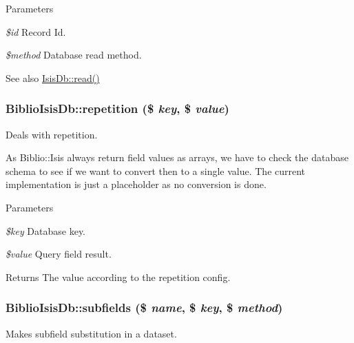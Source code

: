 \begin{DoxyParams}{Parameters}
\item[{\em \$id}]Record Id.\item[{\em \$method}]Database read method.\end{DoxyParams}
\begin{DoxySeeAlso}{See also}
\hyperlink{interfaceIsisDb_a68335ec0db01ef03f0725621b38b5686}{IsisDb::read()} 
\end{DoxySeeAlso}
\hypertarget{classBiblioIsisDb_a04089d61ce04b18aa6a78c94ca02edb9}{
\subsubsection[{repetition}]{\setlength{\rightskip}{0pt plus 5cm}BiblioIsisDb::repetition (\$ {\em key}, \/  \$ {\em value})}}
\label{classBiblioIsisDb_a04089d61ce04b18aa6a78c94ca02edb9}
Deals with repetition.

As Biblio::Isis always return field values as arrays, we have to check the database schema to see if we want to convert then to a single value. The current implementation is just a placeholder as no conversion is done.


\begin{DoxyParams}{Parameters}
\item[{\em \$key}]Database key.\item[{\em \$value}]Query field result.\end{DoxyParams}
\begin{DoxyReturn}{Returns}
The value according to the repetition config. 
\end{DoxyReturn}
\hypertarget{classBiblioIsisDb_a450e26ae0b7f4967d8e25c9a3d023c75}{
\subsubsection[{subfields}]{\setlength{\rightskip}{0pt plus 5cm}BiblioIsisDb::subfields (\$ {\em name}, \/  \$ {\em key}, \/  \$ {\em method})}}
\label{classBiblioIsisDb_a450e26ae0b7f4967d8e25c9a3d023c75}
Makes subfield substitution in a dataset.


